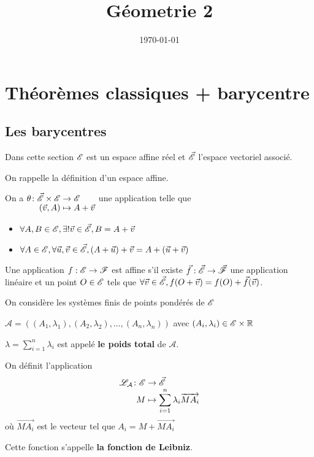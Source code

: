 \documentclass[a4paper,12pt]{article}
\title{ Géometrie 2 }
\date{\today}
\begin{document}
\maketitle
\tableofcontents
\clearpage

\section{Théorèmes classiques + barycentre}

\subsection{Les barycentres}

Dans cette section $\mathscr{E}$ est un espace affine réel et $\vec{\mathscr{E}}$ l'espace vectoriel associé.

\vspace{1em}
On rappelle la définition d'un espace affine.

On a $\funcdef{\theta}{\vec{\E} \times \E}{\E}{(\vec{v}, A)}{A + \vec{v}}$
une application telle que

\begin{itemize}
    \item $\forall A, B \in \mathscr{E}, \exists! \vec{v} \in \vec{\mathscr{E}}, B = A + \vec{v}$
    \item $\forall A \in \mathscr{E}, \forall \vec{u}, \vec{v} \in \vec{\mathscr{E}}, (A + \vec{u}) + \vec{v} = A + (\vec{u} + \vec{v})$
\end{itemize}

Une application $f: \mathscr{E} \to \mathscr{F}$ est affine s'il existe $\vec{f}: \vec{\mathscr{E}} \to \vec{\mathscr{F}}$ une application linéaire
et un point $O \in \mathscr{E}$ tels que $\forall \vec{v} \in \vec{\mathscr{E}}, f(O + \vec{v}) = f(O) + \vec{f}(\vec{v})$.

\vspace{1em}

\begin{definition}
    On considère les systèmes finis de points pondérés de $\mathscr{E}$

    $\mathcal{A} = ((A_1, \lambda_1), (A_2, \lambda_2), \ldots, (A_n, \lambda_n))$
    avec $(A_i, \lambda_i) \in \mathscr{E} \times \mathbb{R}$

    $\lambda = \sum_{i=1}^n \lambda_i$ est appelé \textbf{le poids total} de $\mathcal{A}$.

    On définit l'application
    $$\funcdef{\L}{\E}{\vec{\E}}{M}{\sum_{i=1}^n \lambda_i \overrightarrow{M A_i}}$$
    où $\overrightarrow{M A_i}$ est le vecteur tel que $A_i = M + \overrightarrow{M A_i}$

    Cette fonction s'appelle \textbf{la fonction de Leibniz}.
\end{definition}
\end{document}

